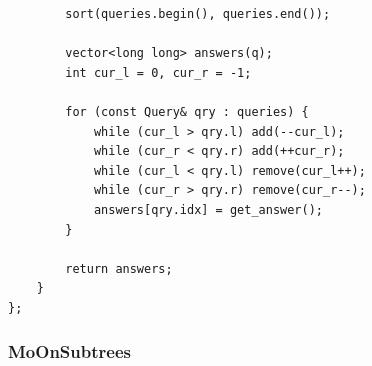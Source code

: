 \documentclass[9pt,a4paper,twocolumn]{extarticle}
\begin{document}
\begin{lstlisting}
        sort(queries.begin(), queries.end());

        vector<long long> answers(q);
        int cur_l = 0, cur_r = -1;

        for (const Query& qry : queries) {
            while (cur_l > qry.l) add(--cur_l);
            while (cur_r < qry.r) add(++cur_r);
            while (cur_l < qry.l) remove(cur_l++);
            while (cur_r > qry.r) remove(cur_r--);
            answers[qry.idx] = get_answer();
        }

        return answers;
    }
};
\end{lstlisting}

\filbreak
\subsubsection{MoOnSubtrees}
\nopagebreak
\end{document}
